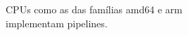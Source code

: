 \documentclass[preview]{standalone}
\begin{document}
CPUs como as das famílias amd64 e arm\\ implementam pipelines.\\
\end{document}
